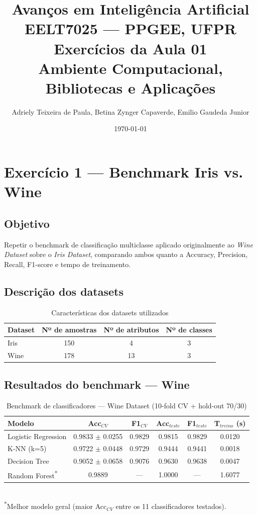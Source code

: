 \documentclass[12pt,a4paper]{article}
\title{
    \Large \textbf{Avanços em Inteligência Artificial} \\
    \large EELT7025 --- PPGEE, UFPR \\[0.3cm]
    \normalsize Exercícios da Aula 01 \\
    \normalsize Ambiente Computacional, Bibliotecas e Aplicações
}
\author{Adriely Teixeira de Paula, Betina Zynger Capaverde, Emilio Gaudeda Junior}
\date{\today}
\begin{document}
\maketitle
\tableofcontents
\newpage

\section{Exercício 1 --- Benchmark Iris vs. Wine}

\subsection{Objetivo}
Repetir o benchmark de classificação multiclasse aplicado originalmente ao \emph{Wine Dataset} sobre o \emph{Iris Dataset}, comparando ambos quanto a Accuracy, Precision, Recall, F1-score e tempo de treinamento.

\subsection{Descrição dos datasets}

\begin{table}[H]
\centering
\caption{Características dos datasets utilizados}
\begin{tabular}{lccc}
\toprule
Dataset & Nº de amostras & Nº de atributos & Nº de classes \\
\midrule
Iris  & 150 & 4  & 3 \\
Wine  & 178 & 13 & 3 \\
\bottomrule
\end{tabular}
\end{table}

\subsection{Resultados do benchmark --- Wine}

\begin{table}[H]
\centering
\caption{Benchmark de classificadores --- Wine Dataset (10-fold CV + hold-out 70/30)}
\begin{tabular}{lccccc}
\toprule
Modelo & Acc$_{CV}$ & F1$_{CV}$ & Acc$_{teste}$ & F1$_{teste}$ & T$_{treino}$ (s) \\
\midrule
Logistic Regression & 0.9833 $\pm$ 0.0255 & 0.9829 & 0.9815 & 0.9829 & 0.0120 \\
K-NN (k=5)           & 0.9722 $\pm$ 0.0448 & 0.9729 & 0.9444 & 0.9441 & 0.0018 \\
Decision Tree        & 0.9052 $\pm$ 0.0658 & 0.9076 & 0.9630 & 0.9638 & 0.0047 \\
Random Forest\textsuperscript{*} & 0.9889 & --- & 1.0000 & --- & 1.6077 \\
\bottomrule
\end{tabular}
\\[0.2cm]
\footnotesize{\textsuperscript{*}Melhor modelo geral (maior Acc$_{CV}$ entre os 11 classificadores testados).}
\end{table}
\end{document}
